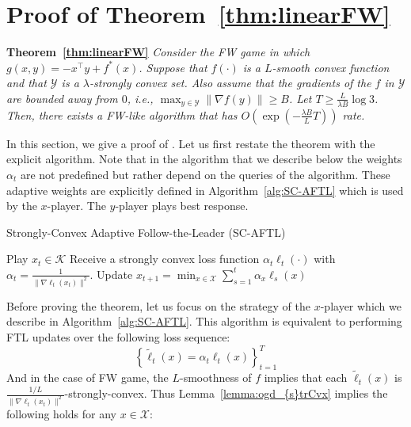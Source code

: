 \documentclass[pmlr]{jmlr} %
\def\K{\mathcal{K}}
\newcommand{\XX}{\mathcal{X}}
\newcommand{\YY}{\mathcal{Y}}
\begin{document}
\section{Proof of Theorem~\ref{thm:linearFW}} \label{app:linearFW}

\noindent\textbf{Theorem~\ref{thm:linearFW}}
\textit{ 
Consider the FW game in which $g(x,y)= -x^{\top}y + f^{*}(x)$.
Suppose that $f(\cdot)$ is a $L$-smooth convex function
and that $\YY$ is a $\lambda$-strongly convex set. Also assume that the gradients of the $f$ in $\YY$ are bounded away from $0$, i.e., $\max_{y\in\YY}\|\nabla f(y)\|\geq B$. Let $T \geq \frac {L}{\lambda B} \log 3$.
Then, there exists a FW-like algorithm that has $O(\exp(-\frac{\lambda B }{L} T))$ rate.
}


In this section, we give a proof of . Let us first restate the theorem with the explicit algorithm.
Note that in the algorithm that we describe below the weights $\alpha_{t}$ are not predefined but rather depend on the queries of the algorithm. These adaptive weights are explicitly defined in Algorithm~\ref{alg:SC-AFTL} which is used by the $x$-player. The $y$-player plays best response.


\begin{algorithm}[h] 
  \caption{Strongly-Convex Adaptive Follow-the-Leader (SC-AFTL)}
  \label{alg:SC-AFTL}
  \begin{algorithmic}[1]
    \STATE Play $x_{t} \in \K$
    \STATE Receive a strongly convex loss function $\alpha_{t} \ell_{t}(\cdot)$ with $\alpha_{t} = \frac{1}{\| \nabla \ell_{t}(x_{t}) \|^{2}} $.
    \STATE Update $x_{t+1} = \min_{x\in \XX} \sum_{s=1}^{t} \alpha_{x} \ell_{s}(x) $  
   \ENDFOR 
  \end{algorithmic}
\end{algorithm}

Before proving the theorem,
let us focus on the strategy of the $x$-player which we describe in Algorithm~\ref{alg:SC-AFTL}.
This algorithm  is equivalent to performing FTL updates  over the following loss sequence:
 \[\left\{\tilde{\ell}_{t}(x) =\alpha_{t} \ell_{t}(x) \right\}_{t=1}^{T}\] 
And in the case of FW game, the $L$-smoothness of $f$ implies  that each $\tilde{\ell}_{t}(x)$ is $\frac{1/L}{\| \nabla \ell_{t}(x_{t})\|^{2}}$-strongly-convex. 
Thus Lemma~\ref{lemma:ogd_{s}trCvx} implies the following holds for any $x\in\XX$:

\end{document}
